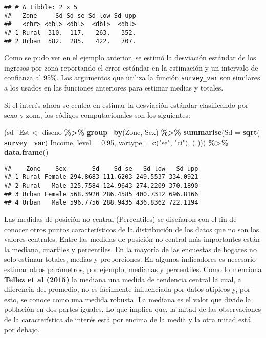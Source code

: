\documentclass[
  12pt,
]{book}
\newenvironment{Shaded}{\begin{snugshade}}{\end{snugshade}}
\newcommand{\AttributeTok}[1]{\textcolor[rgb]{0.13,0.29,0.53}{#1}}
\newcommand{\FloatTok}[1]{\textcolor[rgb]{0.00,0.00,0.81}{#1}}
\newcommand{\FunctionTok}[1]{\textcolor[rgb]{0.13,0.29,0.53}{\textbf{#1}}}
\newcommand{\NormalTok}[1]{#1}
\newcommand{\OtherTok}[1]{\textcolor[rgb]{0.56,0.35,0.01}{#1}}
\newcommand{\SpecialCharTok}[1]{\textcolor[rgb]{0.81,0.36,0.00}{\textbf{#1}}}
\newcommand{\StringTok}[1]{\textcolor[rgb]{0.31,0.60,0.02}{#1}}
\begin{document}
\begin{verbatim}
## # A tibble: 2 x 5
##   Zone     Sd Sd_se Sd_low Sd_upp
##   <chr> <dbl> <dbl>  <dbl>  <dbl>
## 1 Rural  310.  117.   263.   352.
## 2 Urban  582.  285.   422.   707.
\end{verbatim}

Como se pudo ver en el ejemplo anterior, se estimó la desviación estándar de los ingresos por zona reportando el error estándar en la estimación y un intervalo de confianza al 95\%. Los argumentos que utiliza la función \texttt{survey\_var} son similares a los usados en las funciones anteriores para estimar medias y totales.

Si el interés ahora se centra en estimar la desviación estándar clasificando por sexo y zona, los códigos computacionales son los siguientes:

\begin{Shaded}
\begin{Highlighting}[]
\NormalTok{(sd\_Est }\OtherTok{\textless{}{-}}\NormalTok{ diseno }\SpecialCharTok{\%\textgreater{}\%} \FunctionTok{group\_by}\NormalTok{(Zone, Sex) }\SpecialCharTok{\%\textgreater{}\%}
   \FunctionTok{summarise}\NormalTok{(}\AttributeTok{Sd =} \FunctionTok{sqrt}\NormalTok{(}
  \FunctionTok{survey\_var}\NormalTok{(}
\NormalTok{    Income,}
    \AttributeTok{level =} \FloatTok{0.95}\NormalTok{,}
    \AttributeTok{vartype =}  \FunctionTok{c}\NormalTok{(}\StringTok{"se"}\NormalTok{, }\StringTok{"ci"}\NormalTok{),}
\NormalTok{   )}
\NormalTok{))) }\SpecialCharTok{\%\textgreater{}\%} \FunctionTok{data.frame}\NormalTok{()}
\end{Highlighting}
\end{Shaded}

\begin{verbatim}
##    Zone    Sex       Sd    Sd_se   Sd_low   Sd_upp
## 1 Rural Female 294.8683 111.6203 249.5537 334.0921
## 2 Rural   Male 325.7584 124.9643 274.2209 370.1890
## 3 Urban Female 568.3920 286.4585 400.7312 696.8166
## 4 Urban   Male 596.7756 288.9435 436.8362 722.1194
\end{verbatim}

Las medidas de posición no central (Percentiles) se diseñaron con el fin de conocer otros puntos característicos de la distribución de los datos que no son los valores centrales. Entre las medidas de posición no central más importantes están la mediana, cuartiles y percentiles. En la mayoría de las encuestas de hogares no solo estiman totales, medias y proporciones. En algunos indicadores es necesario estimar otros parámetros, por ejemplo, medianas y percentiles. Como lo menciona \textbf{Tellez et al (2015)} la mediana una medida de tendencia central la cual, a diferencia del promedio, no es fácilmente influenciada por datos atípicos y, por esto, se conoce como una medida robusta. La mediana es el valor que divide la población en dos partes iguales. Lo que implica que, la mitad de las observaciones de la característica de interés está por encima de la media y la otra mitad está por debajo.
\end{document}
